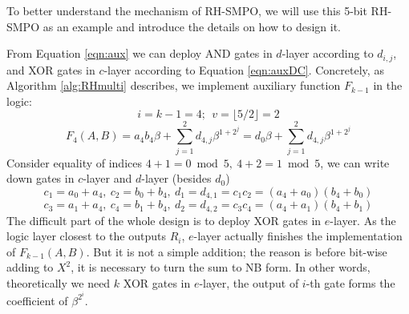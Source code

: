 To better understand the mechanism of RH-SMPO, we will use this 5-bit 
RH-SMPO as an example and introduce the details on how to design it.
\begin{Example}
From Equation \ref{eqn:aux} we can deploy AND gates in $d$-layer according to $d_{i,j}$,
and XOR gates in $c$-layer according to Equation \ref{eqn:auxDC}. Concretely, as Algorithm \ref{alg:RHmulti}
describes, we implement auxiliary function $F_{k-1}$ in the logic:
$$i = k-1 = 4;~~v=\lfloor 5/2 \rfloor = 2$$
\begin{equation}
\label{eqn:5bitRHaux}
F_{4}(A,B) = a_4b_4\beta+\sum_{j=1}^2 d_{4,j}\beta^{1+2^j} = d_0\beta+\sum_{j=1}^2 d_{4,j}\beta^{1+2^j}
\end{equation}
Consider equality of indices $4+1=0\bmod 5,~4+2=1\bmod 5$, we can write down gates in $c$-layer and $d$-layer (besides $d_0$)
$$c_1 = a_0+a_4,~c_2 = b_0+b_4,~d_1=d_{4,1}= c_1c_2 = (a_4+a_0)(b_4+b_0)$$
$$c_3 = a_1+a_4,~c_4 = b_1+b_4,~d_2=d_{4,2}= c_3c_4 = (a_4+a_1)(b_4+b_1)$$
The difficult part of the whole design is to deploy XOR gates in $e$-layer. 
As the logic layer closest to the outputs $R_i$, $e$-layer actually finishes the implementation of 
$F_{k-1}(A,B)$. But it is not a simple addition; the reason is before bit-wise adding to $X^2$, it is necessary to 
turn the sum to NB form. In other words, theoretically we need $k$ XOR gates in $e$-layer, the output of 
$i$-th gate forms the coefficient of $\beta^{2^i}$.


\end{Example}
